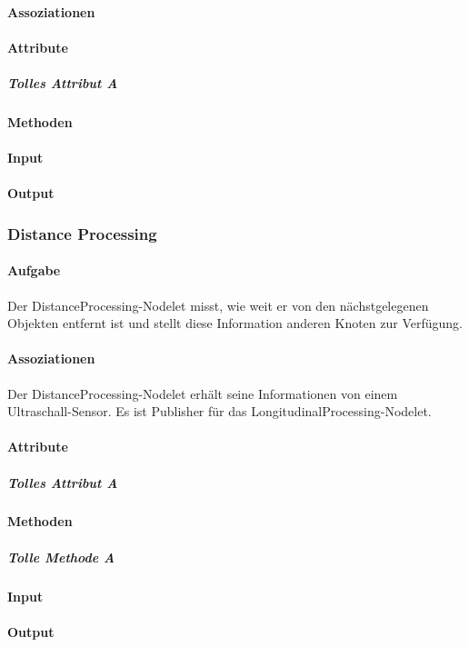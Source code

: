 \documentclass[a4paper, 12pt, titlepage]{scrartcl}
\begin{document}
				\paragraph{Assoziationen}
				\paragraph{Attribute}
					\subparagraph{Tolles Attribut A}
				\paragraph{Methoden}

				\paragraph{Input}
				\paragraph{Output}

			\subsubsection{Distance Processing}
			\label{distance_processing}
				\paragraph{Aufgabe} Der DistanceProcessing-Nodelet misst, wie weit er von den nächstgelegenen Objekten entfernt ist und stellt diese Information anderen Knoten zur Verfügung.
				\paragraph{Assoziationen} Der DistanceProcessing-Nodelet erhält seine Informationen von einem Ultraschall-Sensor. Es ist Publisher für das LongitudinalProcessing-Nodelet.
				\paragraph{Attribute}
					\subparagraph{Tolles Attribut A}
				\paragraph{Methoden}
					\subparagraph{Tolle Methode A}
				\paragraph{Input}
				\paragraph{Output}
\end{document}
